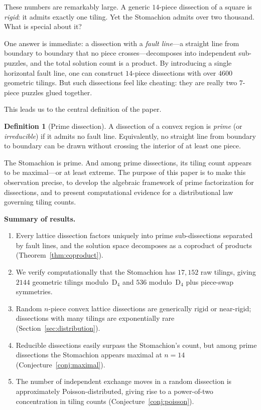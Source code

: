 \documentclass[12pt]{article}
\theoremstyle{definition}
\newtheorem{definition}[theorem]{Definition}
\theoremstyle{remark}
\newcommand{\D}{\mathrm{D}}
\begin{document}
These numbers are remarkably large. A generic $14$-piece dissection of a
square is \emph{rigid}: it admits exactly one tiling. Yet the Stomachion
admits over two thousand. What is special about it?

One answer is immediate: a dissection with a \emph{fault line}---a straight
line from boundary to boundary that no piece crosses---decomposes into
independent sub-puzzles, and the total solution count is a product. By
introducing a single horizontal fault line, one can construct $14$-piece
dissections with over $4600$ geometric tilings. But such dissections feel
like cheating: they are really two $7$-piece puzzles glued together.

This leads us to the central definition of the paper.

\begin{definition}[Prime dissection]
A dissection of a convex region is \emph{prime} (or \emph{irreducible})
if it admits no fault line. Equivalently, no straight line from boundary
to boundary can be drawn without crossing the interior of at least one piece.
\end{definition}

The Stomachion is prime. And among prime dissections, its tiling count
appears to be maximal---or at least extreme. The purpose of this paper is
to make this observation precise, to develop the algebraic framework of
prime factorization for dissections, and to present computational evidence
for a distributional law governing tiling counts.

\medskip
\noindent\textbf{Summary of results.}
\begin{enumerate}[label=(\roman*)]
\item Every lattice dissection factors uniquely into prime
  sub-dissections separated by fault lines, and the solution space
  decomposes as a coproduct of products (Theorem~\ref{thm:coproduct}).
\item We verify computationally that the Stomachion has
  $17{,}152$ raw tilings, giving $2144$ geometric tilings modulo~$\D_4$
  and $536$ modulo~$\D_4$ plus piece-swap symmetries.
\item Random $n$-piece convex lattice dissections are generically rigid
  or near-rigid; dissections with many tilings are exponentially rare
  (Section~\ref{sec:distribution}).
\item Reducible dissections easily surpass the Stomachion's count, but
  among prime dissections the Stomachion appears maximal at $n = 14$
  (Conjecture~\ref{conj:maximal}).
\item The number of independent exchange moves in a random dissection
  is approximately Poisson-distributed, giving rise to a power-of-two
  concentration in tiling counts (Conjecture~\ref{conj:poisson}).
\end{enumerate}
\end{document}
